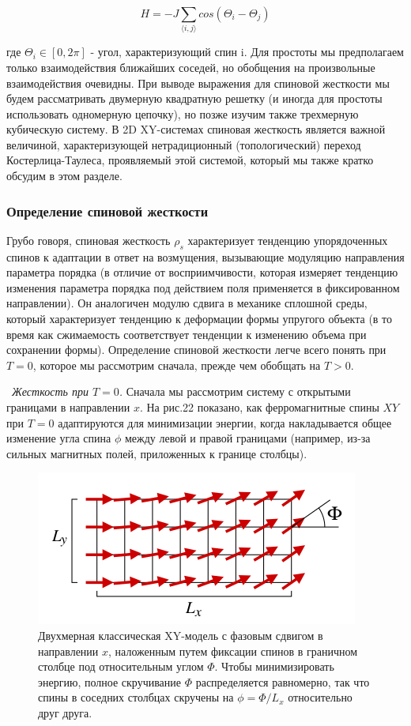 \documentclass[11pt]{article}
\begin{document}
\begin{equation}
H = -J\sum\limits_{\langle i,j \rangle} cos(\Theta_i - \Theta_j)
\label{eq_81}
\end{equation}

где $\Theta_i \in [0, 2\pi]$ - угол, характеризующий спин i. Для простоты мы предполагаем только взаимодействия ближайших соседей, но обобщения на произвольные взаимодействия очевидны. При выводе выражения для спиновой жесткости мы будем рассматривать двумерную квадратную решетку (и иногда для простоты использовать одномерную цепочку), но позже изучим также трехмерную кубическую систему. В 2D XY-системах спиновая жесткость является важной величиной, характеризующей нетрадиционный (топологический) переход Костерлица-Таулеса, проявляемый этой системой, который мы также кратко обсудим в этом разделе.

\subsubsection{Определение спиновой жесткости}
Грубо говоря, спиновая жесткость $\rho_s$ характеризует тенденцию упорядоченных спинов к адаптации в ответ на возмущения, вызывающие модуляцию направления параметра порядка (в отличие от восприимчивости, которая измеряет тенденцию изменения параметра порядка под действием поля применяется в фиксированном направлении). Он аналогичен модулю сдвига в механике сплошной среды, который характеризует тенденцию к деформации формы упругого объекта (в то время как сжимаемость соответствует тенденции к изменению объема при сохранении формы). Определение спиновой жесткости легче всего понять при $T = 0$, которое мы рассмотрим сначала, прежде чем обобщать на $T> 0$.

~\emph{Жесткость при $T = 0$. }
Сначала мы рассмотрим систему с открытыми границами в направлении $x$. На рис.22 показано, как ферромагнитные спины $XY$ при $T = 0$ адаптируются для минимизации энергии, когда накладывается общее изменение угла спина $\phi$ между левой и правой границами (например, из-за сильных магнитных полей, приложенных к границе столбцы). 

\begin{figure}[htp]
\centering
\includegraphics[scale=0.5]{fig22}
\caption{Двухмерная классическая XY-модель с фазовым сдвигом в направлении $x$, наложенным путем фиксации спинов в граничном столбце под относительным углом $\Phi$. Чтобы минимизировать энергию, полное скручивание $\Phi$ распределяется равномерно, так что спины в соседних столбцах скручены на $\phi = \Phi / L_x$ относительно друг друга.}
\label{}
\end{figure}
\end{document}
